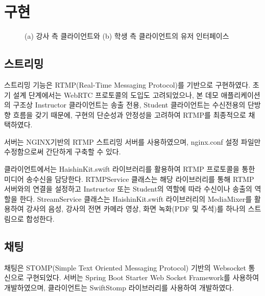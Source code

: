 \documentclass[10pt, a4paper, oneside]{article}
\begin{document}
\section{구현}
\begin{figure}[htbp]
    \begin{center}
        \caption{(a) 강사 측 클라이언트와 (b) 학생 측 클라이언트의 유저 인터페이스}
        \label{fig:fig3}
    \end{center}
\end{figure}

\subsection{스트리밍}
스트리밍 기능은 RTMP(Real-Time Messaging Protocol)를 기반으로 구현하였다. 초기 설계 단계에서는 WebRTC 프로토콜의 도입도 고려되었으나, 본 데모 애플리케이션의 구조상 Instructor 클라이언트는 송출 전용, Student 클라이언트는 수신전용의 단방향 흐름을 갖기 때문에, 구현의 단순성과 안정성을 고려하여 RTMP를 최종적으로 채택하였다.

서버는 NGINX기반의 RTMP 스트리밍 서버를 사용하였으며, nginx.conf 설정 파일만 수정함으로써 간단하게 구축할 수 있다.

클라이언트에서는 HaishinKit.swift\cite{HaishinKit} 라이브러리를 활용하여 RTMP 프로토콜을 통한 미디어 송수신을 담당한다. RTMPService 클래스는 해당 라이브러리를 통해 RTMP 서버와의 연결을 설정하고 Instructor 또는 Student의 역할에 따라 수신이나 송출의 역할을 한다. StreamService 클래스는 HaishinKit.swift 라이브러리의 MediaMixer를 활용하여 강사의 음성, 강사의 전면 카메라 영상, 화면 녹화(PDF 및 주석)를 하나의 스트림으로 합성한다.
\subsection{채팅}
채팅은 STOMP(Simple Text Oriented Messaging Protocol) 기반의 Websocket 통신으로 구현되었다. 서버는 Spring Boot Starter Web Socket Framework를 사용하여 개발하였으며, 클라이언트는 SwiftStomp\cite{SwiftStomp} 라이브러리를 사용하여 개발하였다.
\end{document}
